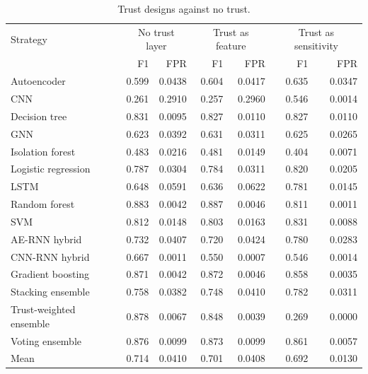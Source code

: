 \begin{table}[H]
\centering
\small
\begin{tabular}{lrrrrrr}
\toprule
Strategy & \multicolumn{2}{c}{No trust layer} & \multicolumn{2}{c}{Trust as feature} & \multicolumn{2}{c}{Trust as sensitivity} \\
 & F1 & FPR & F1 & FPR & F1 & FPR \\
\midrule
Autoencoder & 0.599 & 0.0438 & 0.604 & 0.0417 & 0.635 & 0.0347 \\
CNN & 0.261 & 0.2910 & 0.257 & 0.2960 & 0.546 & 0.0014 \\
Decision tree & 0.831 & 0.0095 & 0.827 & 0.0110 & 0.827 & 0.0110 \\
GNN & 0.623 & 0.0392 & 0.631 & 0.0311 & 0.625 & 0.0265 \\
Isolation forest & 0.483 & 0.0216 & 0.481 & 0.0149 & 0.404 & 0.0071 \\
Logistic regression & 0.787 & 0.0304 & 0.784 & 0.0311 & 0.820 & 0.0205 \\
LSTM & 0.648 & 0.0591 & 0.636 & 0.0622 & 0.781 & 0.0145 \\
Random forest & 0.883 & 0.0042 & 0.887 & 0.0046 & 0.811 & 0.0011 \\
SVM & 0.812 & 0.0148 & 0.803 & 0.0163 & 0.831 & 0.0088 \\
AE-RNN hybrid & 0.732 & 0.0407 & 0.720 & 0.0424 & 0.780 & 0.0283 \\
CNN-RNN hybrid & 0.667 & 0.0011 & 0.550 & 0.0007 & 0.546 & 0.0014 \\
Gradient boosting & 0.871 & 0.0042 & 0.872 & 0.0046 & 0.858 & 0.0035 \\
Stacking ensemble & 0.758 & 0.0382 & 0.748 & 0.0410 & 0.782 & 0.0311 \\
Trust-weighted ensemble & 0.878 & 0.0067 & 0.848 & 0.0039 & 0.269 & 0.0000 \\
Voting ensemble & 0.876 & 0.0099 & 0.873 & 0.0099 & 0.861 & 0.0057 \\
\midrule
Mean & 0.714 & 0.0410 & 0.701 & 0.0408 & 0.692 & 0.0130 \\
\bottomrule
\end{tabular}
\caption{Trust designs against no trust.}
\label{tab:trust-designs}
\end{table}
